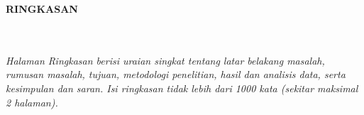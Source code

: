 \clearpage
{}%
\thispagestyle{fancy}

\begin{center}
	\large \bfseries \MakeUppercase{Ringkasan}\\
	\normalsize \normalfont {\thetitle}\\
	\normalsize \normalfont {\theauthor}\\
	\bigskip

	\normalsize \normalfont \justifying
	\normalsize \normalfont \justifying
	\textit{Halaman Ringkasan berisi uraian singkat tentang latar belakang masalah, rumusan masalah, tujuan, metodologi penelitian, hasil dan analisis data, serta kesimpulan dan saran. Isi ringkasan tidak lebih dari 1000 kata (sekitar maksimal 2 halaman).}\par
	\lipsum[1-2] %

	\vfill

\end{center}
\clearpage
